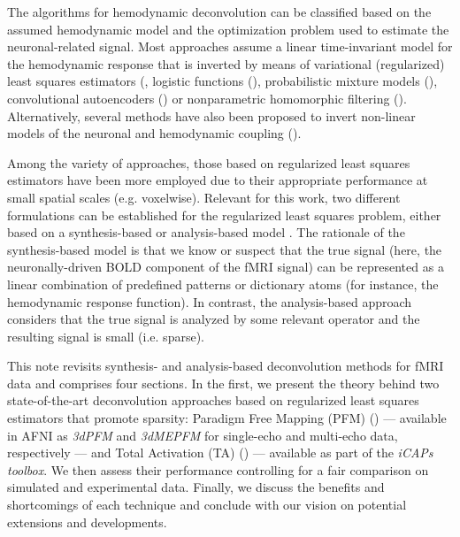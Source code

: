 The algorithms for hemodynamic deconvolution can be classified based on the assumed hemodynamic model and the optimization problem used to estimate the neuronal-related signal. Most approaches assume a linear time-invariant model for the hemodynamic response that is inverted by means of variational (regularized) least squares estimators (\citealt{glover1999deconvolution,gitelman2003ModelingRegionalPsychophysiologic,karahanoglu2013TotalActivationfMRI,gaudes2011DetectionCharacterizationSingletrial,caballero-gaudes2019DeconvolutionAlgorithmMultiecho,caballerogaudes2013ParadigmFreeMapping,gaudes2012StructuredSparseDeconvolution,cherkaoui2019SparsitybasedBlindDeconvolution,hernandez2011neuronal,costantini2021,Huetel2021}, logistic functions (\citealt{Bush2013,Bush2015a,Loula2018}), probabilistic mixture models (\cite{pidnebesna2019}), convolutional autoencoders (\citealt{hutel2018neural}) or nonparametric homomorphic filtering (\citealt{Sreenivasan2015}). Alternatively, several methods have also been proposed to invert non-linear models of the neuronal and hemodynamic coupling (\citealt{Riera2004,Friston2008,Havlicek2011,Aslan2016,Madi2017,RuizEuler2018}). 

Among the variety of approaches, those based on regularized least squares estimators have been more employed due to their appropriate performance at small spatial scales (e.g. voxelwise). Relevant for this work, two different formulations can be established for the regularized least squares problem, either based on a synthesis-based or analysis-based model \citealt{elad2007AnalysisSynthesisSignal,ortelli2019SynthesisAnalysisTotal}. The rationale of the synthesis-based model is that we know or suspect that the true signal (here, the neuronally-driven BOLD component of the fMRI signal) can be represented as a linear combination of predefined patterns or dictionary atoms (for instance, the hemodynamic response function). In contrast, the analysis-based approach considers that the true signal is analyzed by some relevant operator and the resulting signal is small (i.e. sparse).  

This note revisits synthesis- and analysis-based deconvolution methods for fMRI data and comprises four sections. In the first, we present the theory behind two state-of-the-art deconvolution approaches based on regularized least squares estimators that promote sparsity: Paradigm Free Mapping (PFM) (\citealt{caballerogaudes2013ParadigmFreeMapping}) --- available in AFNI as \textit{3dPFM} and \textit{3dMEPFM} for single-echo and multi-echo data, respectively --- and Total Activation (TA) (\citealt{karahanoglu2013TotalActivationfMRI}) --- available as part of the \textit{iCAPs toolbox}. We then assess their performance controlling for a fair comparison on simulated and experimental data. Finally, we discuss the benefits and shortcomings of each technique and conclude with our vision on potential extensions and developments.
